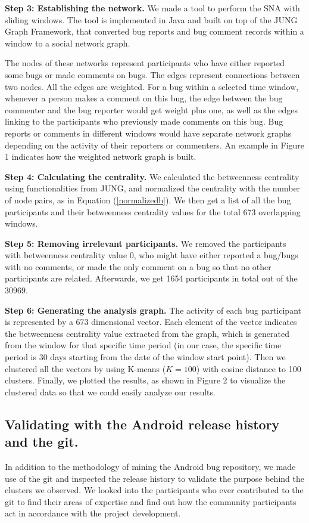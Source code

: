 \documentclass[conference]{IEEEtran}
\begin{document}
\textbf{Step 3: Establishing the network.} We made a tool to perform the SNA with sliding
windows. The tool is implemented in Java and built on top of the JUNG Graph Framework, that converted bug
reports and bug comment records within a window to a social network graph.

The nodes of these networks represent participants who have either
reported some bugs or made comments on bugs. The edges represent
connections between two nodes. All the edges are weighted.  
For a bug within a selected time window, whenever a person
makes a comment on this bug, the edge between the bug commenter and
the bug reporter would get weight plus one, as well as the edges
linking to the participants who previously made comments on this
bug. Bug reports or comments in different windows would have separate
network graphs depending on the activity of their reporters or
commenters. An example in Figure 1 indicates how the weighted network
graph is built.


\textbf{Step 4: Calculating the centrality.} We calculated the
betweenness centrality using functionalities from JUNG, and normalized the centrality with the number of node pairs, as in Equation (\ref{normalizedb}). We then get a list of all the bug participants and
their betweenness centrality values for the total 673 overlapping
windows.


\textbf{Step 5: Removing irrelevant participants.} We removed the
participants with betweenness centrality value 0, who might have
either reported a bug/bugs with no comments, or made the only comment
on a bug so that no other participants are related. Afterwards, we get
1654 participants in total out of the 30969.


\textbf{Step 6: Generating the analysis graph.} The activity
of each bug participant is represented by a 673 dimensional vector. Each element of the vector indicates the betweenness centrality value extracted
from the graph, which is generated from the window for that
specific time period (in our case, the specific time period is 30 days
starting from the date of the window start point). Then we clustered
all the vectors by using K-means ($K=100$) with cosine distance to 100
clusters. Finally, we plotted the results, as shown in Figure 2 to
visualize the clustered data so that we could easily analyze
our results.


\subsection{Validating with the Android release history and the git.} 
In addition to the methodology of mining the Android
bug repository, we made use of the git and
inspected the release history to validate the purpose behind the
clusters we observed.
We looked into the participants who ever contributed to the git to find their areas of expertise and find out how the community participants
act in accordance with the project development.
\end{document}
